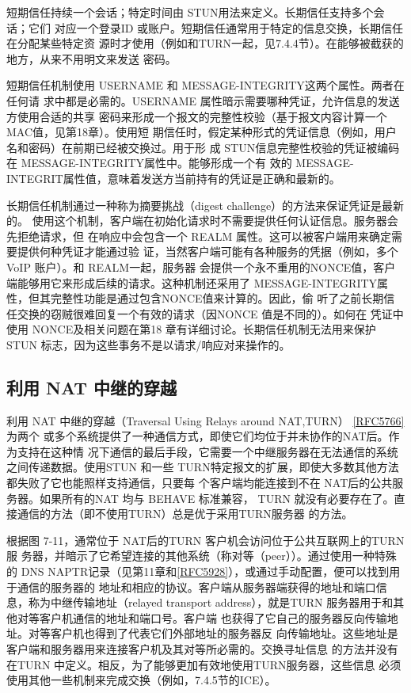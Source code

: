 短期信任持续一个会话；特定时间由 STUN用法来定义。长期信任支持多个会话；它们
对应一个登录ID 或账户。短期信任通常用于特定的信息交换，长期信任在分配某些特定资
源时才使用（例如和TURN一起，见7.4.4节）。在能够被截获的地方，从来不用明文来发送
密码。

短期信任机制使用 USERNAME 和 MESSAGE-INTEGRITY这两个属性。两者在任何请
求中都是必需的。USERNAME 属性暗示需要哪种凭证，允许信息的发送方使用合适的共享
密码来形成一个报文的完整性校验（基于报文内容计算一个MAC值，见第18章）。使用短
期信任时，假定某种形式的凭证信息（例如，用户名和密码）在前期已经被交换过。用于形
成 STUN信息完整性校验的凭证被编码在 MESSAGE-INTEGRITY属性中。能够形成一个有
效的 MESSAGE-INTEGRIT属性值，意味着发送方当前持有的凭证是正确和最新的。

长期信任机制通过一种称为摘要挑战（digest challenge）的方法来保证凭证是最新的。
使用这个机制，客户端在初始化请求时不需要提供任何认证信息。服务器会先拒绝请求，但
在响应中会包含一个 REALM 属性。这可以被客户端用来确定需要提供何种凭证才能通过验
证，当然客户端可能有各种服务的凭据（例如，多个 VoIP 账户）。和 REALM一起，服务器
会提供一个永不重用的NONCE值，客户端能够用它来形成后续的请求。这种机制还采用了
MESSAGE-INTEGRITY属性，但其完整性功能是通过包含NONCE值来计算的。因此，偷
听了之前长期信任交换的窃贼很难回复一个有效的请求（因NONCE 值是不同的）。如何在
凭证中使用 NONCE及相关问题在第18 章有详细讨论。长期信任机制无法用来保护 STUN
标志，因为这些事务不是以请求/响应对来操作的。

\subsection{利用 NAT 中继的穿越}

利用 NAT 中继的穿越（Traversal Using Relays around NAT,TURN）
\href{https://www.rfc-editor.org/rfc/rfc5766}{[RFC5766]}为两个
或多个系统提供了一种通信方式，即使它们均位于并未协作的NAT后。作为支持在这种情
况下通信的最后手段，它需要一个中继服务器在无法通信的系统之间传递数据。使用STUN
和一些 TURN特定报文的扩展，即使大多数其他方法都失败了它也能照样支持通信，只要每
个客户端均能连接到不在 NAT后的公共服务器。如果所有的NAT 均与 BEHAVE 标准兼容，
TURN 就没有必要存在了。直接通信的方法（即不使用TURN）总是优于采用TURN服务器
的方法。

根据图 7-11，通常位于 NAT后的TURN 客户机会访问位于公共互联网上的TURN服
务器，并暗示了它希望连接的其他系统（称对等（peer））。通过使用一种特殊的 DNS
NAPTR记录（见第11章和\href{https://www.rfc-editor.org/rfc/rfc5928}{[RFC5928]}），或通过手动配置，便可以找到用于通信的服务器的
地址和相应的协议。客户端从服务器端获得的地址和端口信息，称为中继传输地址（relayed
transport address），就是TURN 服务器用于和其他对等客户机通信的地址和端口号。客户端
也获得了它自己的服务器反向传输地址。对等客户机也得到了代表它们外部地址的服务器反
向传输地址。这些地址是客户端和服务器用来连接客户机及其对等所必需的。交换寻址信息
的方法并没有在TURN 中定义。相反，为了能够更加有效地使用TURN服务器，这些信息
必须使用其他一些机制来完成交换（例如，7.4.5节的ICE）。

